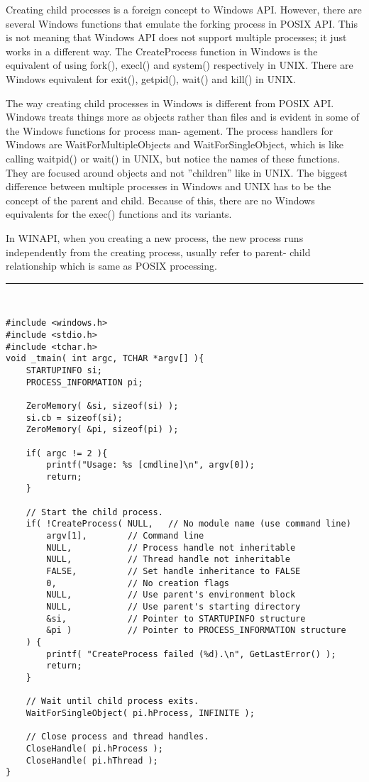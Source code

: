 \documentclass[letterpaper,12pt,titlepage]{article}
\begin{document}
Creating child processes is a foreign concept to Windows API. However, there are several Windows functions that emulate the forking process in POSIX API. This is not meaning that Windows API does not support multiple processes; it just works in a different way. The CreateProcess function in Windows is the equivalent of using fork(), execl() and system() respectively in UNIX. There are Windows equivalent for exit(), getpid(), wait() and kill() in UNIX.\par
The way creating child processes in Windows is different from POSIX API. Windows treats things more as objects rather than files and is evident in some of the Windows functions for process man- agement. The process handlers for Windows are WaitForMultipleObjects and WaitForSingleObject, which is like calling waitpid() or wait() in UNIX, but notice the names of these functions. They are focused around objects and not ”children” like in UNIX. The biggest difference between multiple processes in Windows and UNIX has to be the concept of the parent and child. Because of this, there are no Windows equivalents for the exec() functions and its variants. \par
In WINAPI, when you creating a new process, the new process runs independently from the creating process, usually refer to parent- child relationship which is same as POSIX processing.\par
\noindent\rule{15.5cm}{0.4pt}\\
\begin{verbatim}
#include <windows.h>
#include <stdio.h>
#include <tchar.h>
void _tmain( int argc, TCHAR *argv[] ){
    STARTUPINFO si;
    PROCESS_INFORMATION pi;

    ZeroMemory( &si, sizeof(si) );
    si.cb = sizeof(si);
    ZeroMemory( &pi, sizeof(pi) );

    if( argc != 2 ){
        printf("Usage: %s [cmdline]\n", argv[0]);
        return;
    }

    // Start the child process. 
    if( !CreateProcess( NULL,   // No module name (use command line)
        argv[1],        // Command line
        NULL,           // Process handle not inheritable
        NULL,           // Thread handle not inheritable
        FALSE,          // Set handle inheritance to FALSE
        0,              // No creation flags
        NULL,           // Use parent's environment block
        NULL,           // Use parent's starting directory 
        &si,            // Pointer to STARTUPINFO structure
        &pi )           // Pointer to PROCESS_INFORMATION structure
    ) {
        printf( "CreateProcess failed (%d).\n", GetLastError() );
        return;
    }

    // Wait until child process exits.
    WaitForSingleObject( pi.hProcess, INFINITE );

    // Close process and thread handles. 
    CloseHandle( pi.hProcess );
    CloseHandle( pi.hThread );
}
\end{verbatim}
\end{document}
